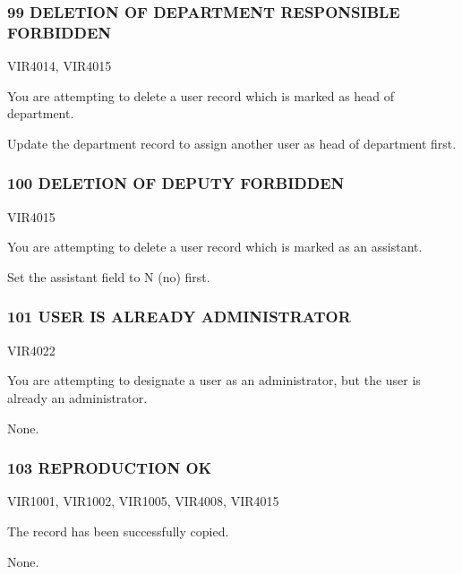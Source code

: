 \documentclass[letterpaper,10pt,english]{sphinxmanual}
\begin{document}
\subsubsection{99 DELETION OF DEPARTMENT RESPONSIBLE FORBIDDEN}
\label{\detokenize{messages:deletion-of-department-responsible-forbidden}}\begin{description}
\sphinxAtStartPar
VIR4014, VIR4015

\sphinxAtStartPar
You are attempting to delete a user record which is marked as head of department.

\sphinxAtStartPar
Update the department record to assign another user as head of department first.

\end{description}


\subsubsection{100 DELETION OF DEPUTY FORBIDDEN}
\label{\detokenize{messages:deletion-of-deputy-forbidden}}\begin{description}
\sphinxAtStartPar
VIR4015

\sphinxAtStartPar
You are attempting to delete a user record which is marked as an assistant.

\sphinxAtStartPar
Set the assistant field to N (no) first.

\end{description}


\subsubsection{101 USER IS ALREADY ADMINISTRATOR}
\label{\detokenize{messages:user-is-already-administrator}}\begin{description}
\sphinxAtStartPar
VIR4022

\sphinxAtStartPar
You are attempting to designate a user as an administrator, but the user is already an administrator.

\sphinxAtStartPar
None.

\end{description}


\subsubsection{103 REPRODUCTION OK}
\label{\detokenize{messages:reproduction-ok}}\begin{description}
\sphinxAtStartPar
VIR1001, VIR1002, VIR1005, VIR4008, VIR4015

\sphinxAtStartPar
The record has been successfully copied.

\sphinxAtStartPar
None.

\end{description}
\end{document}
